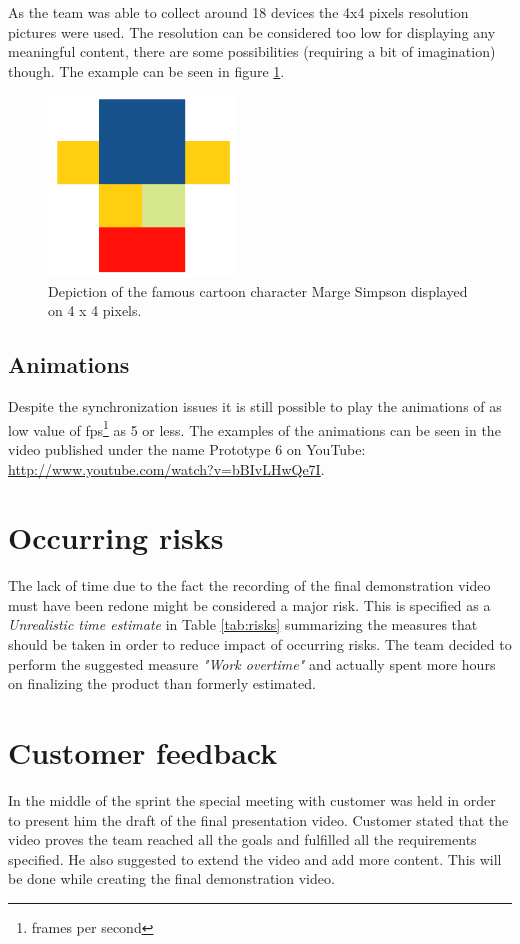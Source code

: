 As the team was able to collect around 18 devices the 4x4 pixels resolution pictures were used. The resolution can be considered too low for displaying any meaningful content, there are some possibilities (requiring a bit of imagination) though. The example can be seen in figure \ref{fig:sprint6_marge}.

\begin{figure}[H]
	\centering
		\includegraphics[width=5cm]{./sprint6/marge.png}
	\caption{Depiction of the famous cartoon character Marge Simpson displayed on 4 x 4 pixels.}
	\label{fig:sprint6_marge}
\end{figure}

\subsection{Animations}
Despite the synchronization issues it is still possible to play the animations of as low value of fps\footnote{frames per second} as 5 or less. The examples of the animations can be seen in the video published under the name Prototype 6 on YouTube: \url{http://www.youtube.com/watch?v=bBIvLHwQe7I}.

\section{Occurring risks}
The lack of time due to the fact the recording of the final demonstration video must have been redone might be considered a major risk. This is specified as a \textit{Unrealistic time estimate} in Table \ref{tab:risks} summarizing the measures that should be taken in order to reduce impact of occurring risks. The team decided to perform the suggested measure \textit{"Work overtime"} and actually spent more hours on finalizing the product than formerly estimated.

\section{Customer feedback}
In the middle of the sprint the special meeting with customer was held in order to present him the draft of the final presentation video. Customer stated that the video proves the team reached all the goals and fulfilled all the requirements specified. He also suggested to extend the video and add more content. This will be done while creating the final demonstration video.

